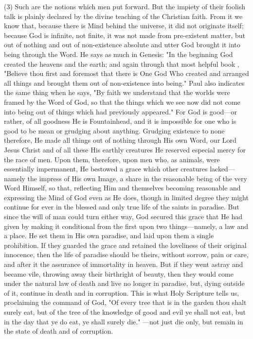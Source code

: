 \documentclass[9pt, twocolumn, oneside, a4paper]{memoir}
\begin{document}
\textsc{(3)} Such are the notions which men put forward. But the       impiety of their foolish talk is plainly declared by the divine teaching of the       Christian faith. From it we know that, because there is Mind behind the       universe, it did not originate itself; because God is infinite, not finite, it       was not made from pre-existent matter, but out of nothing and out of       non-existence absolute and utter God brought it into being through the Word. He       says as much in Genesis:             "In the beginning God created the heavens and the       earth;       and again through that most helpful book ,       "Believe thou first and foremost that there is One God       Who created and arranged all things and brought them out of non-existence into       being."       Paul also indicates the same thing when he says,       "By faith we understand that the worlds were framed by       the Word of God, so that the things which we see now did not come into being       out of things which had previously appeared."       For God is good—or rather, of all goodness He is Fountainhead, and it is impossible       for one who is good to be mean or grudging about anything. Grudging existence to       none therefore, He made all things out of nothing through His own Word, our Lord       Jesus Christ and of all these His earthly creatures He reserved especial mercy       for the race of men. Upon them, therefore, upon men who, as animals, were       essentially impermanent, He bestowed a grace which other creatures       lacked—namely the impress of His own Image, a share in the reasonable being of       the very Word Himself, so that, reflecting Him and themselves becoming       reasonable and expressing the Mind of God even as He does, though in limited       degree they might continue for ever in the blessed and only true life of the       saints in paradise. But since the will of man could turn either way, God secured       this grace that He had given by making it conditional from the first upon two       things—namely, a law and a place. He set them in His own paradise, and laid       upon them a single prohibition. If they guarded the grace and retained the       loveliness of their original innocence, then the life of paradise should be       theirs, without sorrow, pain or care, and after it the assurance of immortality       in heaven. But if they went astray and became vile, throwing away their       birthright of beauty, then they would come under the natural law of death and       live no longer in paradise, but, dying outside of it, continue in death and in       corruption. This is what Holy Scripture tells us, proclaiming the command of God,       "Of every tree that is in the garden thou shalt surely       eat, but of the tree of the knowledge of good and evil ye shall not eat, but       in the day that ye do eat, ye shall surely die."       —not just die only, but remain in the state of death       and of corruption.   
\end{document}

